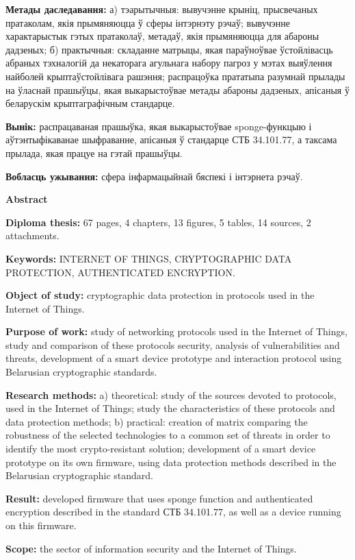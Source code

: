 \textbf{Метады даследавання:} а) тэарытычныя: вывучэнне крыніц, прысвечаных пратаколам, якія прымяняюцца 
ў сферы інтэрнэту рэчаў; вывучэнне характарыстык гэтых пратаколаў, метадаў, якія прымяняюцца для абароны 
дадзеных; б) практычныя: складанне матрыцы, якая параўноўвае ўстойлівасць абраных тэхналогій да некаторага 
агульнага набору пагроз у мэтах выяўлення найболей крыптаўстойлівага рашэння; распрацоўка прататыпа 
разумнай прылады на ўласнай прашыўцы, якая выкарыстоўвае метады абароны дадзеных, апісаныя ў беларускім 
крыптаграфічным стандарце.

\textbf{Вынік:} распрацаваная прашыўка, якая выкарыстоўвае sponge-функцыю і аўтэнтыфікаванае шыфраванне, 
апісаныя ў стандарце СТБ 34.101.77, а таксама прылада, якая працуе на гэтай прашыўцы.

\textbf{Вобласць ужывання:} сфера інфармацыйнай бяспекі і інтэрнета рэчаў.


\newpage
\begin{center}{\bf \Large Abstract}\end{center}

\textbf{Diploma thesis:} 67 pages, 4 chapters, 13 figures, 5 tables, 14 sources, 2 attachments.

\textbf{Keywords:} INTERNET OF THINGS, CRYPTOGRAPHIC DATA \newline PROTECTION, 
AUTHENTICATED ENCRYPTION.

\textbf{Object of study:} cryptographic data protection in protocols used in the Internet of Things.

\textbf{Purpose of work:} study of networking protocols used in the Internet of Things, study and 
comparison of these protocols security, analysis of vulnerabilities and threats, development 
of a smart device prototype and interaction protocol using Belarusian cryptographic standards.

\textbf{Research methods:} a) theoretical: study of the sources devoted to protocols, used in the 
Internet of Things; study the characteristics of these protocols and data protection methods; 
b) practical: creation of matrix comparing the robustness of the selected technologies to a common 
set of threats in order to identify the most crypto-resistant solution; development 
of a smart device prototype on its own firmware, using data protection methods described in the Belarusian 
cryptographic standard.

\textbf{Result:} developed firmware that uses sponge function and authenticated encryption described 
in the standard СТБ 34.101.77, as well as a device running on this firmware.

\textbf{Scope:} the sector of information security and the Internet of Things.
